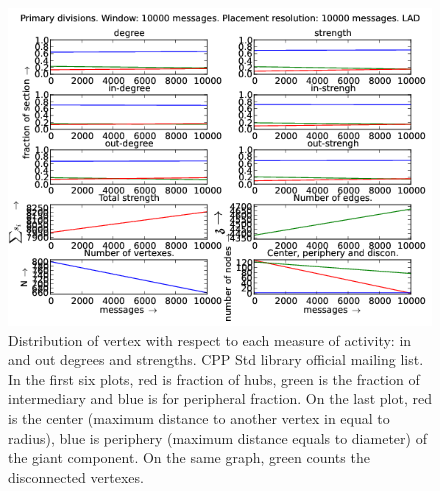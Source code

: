 \documentclass[%
 aip,
 jmp,%
 amsmath,amssymb,
 reprint,%
]{revtex4-1}
\begin{document}
\begin{figure}[hbtp] 
   \centering
        \includegraphics[width=\textwidth]{figs/LAD/10000}
    \caption{Distribution of vertex with respect to each measure of activity: in and out degrees and strengths. CPP Std library official mailing list. In the first six plots, red is fraction of hubs, green is the fraction of intermediary and blue is for peripheral fraction. On the last plot, red is the center (maximum distance to another vertex in equal to radius), blue is periphery (maximum distance equals to diameter) of the giant component. On the same graph, green counts the disconnected vertexes.}
    \label{fig:lad10000}
\end{figure}
\end{document}
